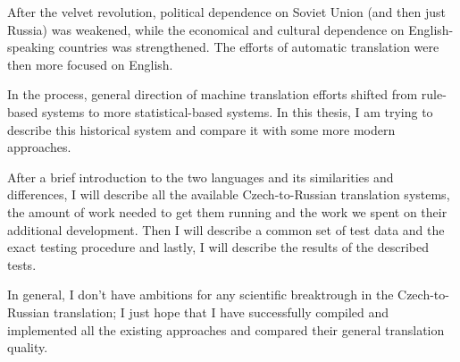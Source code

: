 After the velvet revolution, political dependence on Soviet Union (and then just Russia) was weakened, while the economical and cultural dependence on English-speaking countries was strengthened. The efforts of automatic translation were then more focused on English. 

In the process, general direction of machine translation efforts shifted from rule-based systems to more statistical-based systems. In this thesis, I am trying to describe this historical system and compare it with some more modern approaches.


After a brief introduction to the two languages and its similarities and differences, I will describe all the available Czech-to-Russian translation systems, the amount of work needed to get them running and the work we spent on their additional development. Then I will describe a common set of test data and the exact testing procedure and lastly, I will describe the results of the described tests.

In general, I don't have ambitions for any scientific breaktrough in the Czech-to-Russian translation; I just hope that I have successfully compiled and implemented all the existing approaches and compared their general translation quality.
